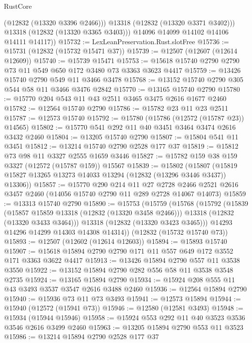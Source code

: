 \begin{lexlean}{RustCore}
\begin{coremodule}
              (@12832 (@13320 @3396 @2466)))
            @13318
            (@12832 (@13320 @3371 @3402)))
          @13318
          (@12832 (@13320 @3365 @3403)))
        @14096
        @14099
        @14102
        @14106
        @14111
        @14117))
@15732 := LexLeanPreservation.Rust.slotFree
@15736 := @15731 (@12832 (@15732 @15471 @37))
@15739 := @12507 (@12607 (@12614 @12609))
@15740 := @15739 @15471
@15753 := @15618 @15740 @2790 @2790 @73 @11 @549 @650 @172 @3480 @73 @3363 @3623 @4417
@15759 := @13426 @15740 @2790 @549 @11 @3466 @3478
@15768 := @13152 @15740 @2790 @305 @544 @58 @11 @3466 @3476 @2842
@15770 := @13165 @15740 @2790
@15780 := @15770 @204 @543 @11 @43 @2511 @3465 @3475 @2616 @1677 @2460
@15782 := @12564 @15740 @2790
@15786 := @15782 @23 @11 @23 @2511
@15787 := @12573 @15740
@15792 := @15780 (@15786 (@12572 (@15787 @23)) @14565)
@15802 := @15770 @541 @292 @11 @40 @3451 @3464 @3474 @2616 @3432 @2460
@15804 := @13205 @15740 @2790
@15807 := @15804 @541 @11 @3451
@15812 := @13214 @15740 @2790 @2528 @177 @37
@15819 := @15812 @73 @98 @11 @3327 @2555 @1659 @3446
@15827 := @15782 @159 @38 @159 @3327 (@12572 (@15787 @159)) @15567
@15839 := @15802
    (@15807 (@15819 @15827 @13265 @13273 @14033 @13294 (@12832 (@13296 @3446 @3437)) @13306))
@15857 := @15770
    @290
    @214
    @11
    @27
    @2728
    @2466
    @2521
    @2616
    @3457
    @2460
    (@14056 @15740 @2790 @11 @289 @2728 @14067 @14073)
@15859 := @13313 @15740 @2790
@15890 := @15753
    (@15759
      (@15768
        (@15792
          (@15839
            (@15857 @15859 @13318 (@12832 (@13320 @3458 @2466)))
            @13318
            (@12832 (@13320 @3433 @3464)))
          @13318
          (@12832 (@13320 @3423 @3465)))
        @14293
        @14296
        @14299
        @14303
        @14308
        @14314))
    (@12832 (@15732 @15740 @73))
@15893 := @12507 (@12602 (@12614 @12603))
@15894 := @15893 @15740
@15907 := @15618 @15894 @2790 @2790 @171 @11 @557 @649 @172 @3552 @171 @3363 @3622 @4417
@15913 := @13426 @15894 @2790 @557 @11 @3538 @3550
@15922 := @13152 @15894 @2790 @282 @556 @58 @11 @3538 @3548 @2735
@15924 := @13165 @15894 @2790
@15934 := @15924 @208 @555 @11 @43 @3493 @3537 @3547 @2616 @3488 @2460
@15936 := @12564 @15894 @2790
@15940 := @15936 @73 @11 @73 @3493
@15941 := @12573 @15894
@15944 := @15940 (@12572 (@15941 @73))
@15946 := @12580 (@12581 @3493)
@15948 := @15934 (@15944 @15946)
@15958 := @15924 @553 @292 @11 @40 @3523 @3536 @3546 @2616 @3499 @2460
@15963 := @13205 @15894 @2790 @553 @11 @3523
@15986 := @13214
    @15894
    @2790
    @2528
    @177
    @37

\end{coremodule}
\end{lexlean}
